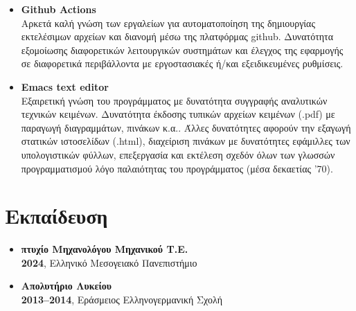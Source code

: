 \documentclass[a4paper,9pt]{extarticle}
\begin{document}
\begin{itemize}
\item{\textbf{Github Actions}} \\
        \noindent
        Αρκετά καλή γνώση των εργαλείων για αυτοματοποίηση της δημιουργίας εκτελέσιμων
        αρχείων και διανομή μέσω της πλατφόρμας github.
        Δυνατότητα εξομοίωσης διαφορετικών λειτουργικών συστημάτων και έλεγχος
        της εφαρμογής σε διαφορετικά περιβάλλοντα με εργοστασιακές ή/και
        εξειδικευμένες ρυθμίσεις. \\

\item{\textbf{Emacs text editor}} \\
        \noindent
        Εξαιρετική γνώση του προγράμματος με δυνατότητα συγγραφής αναλυτικών
        τεχνικών κειμένων. Δυνατότητα έκδοσης τυπικών αρχείων κειμένων (.pdf)
        με παραγωγή διαγραμμάτων, πινάκων κ.α.. Άλλες δυνατότητες αφορούν την
        εξαγωγή στατικών ιστοσελίδων (.html),
        διαχείριση πινάκων με δυνατότητες εφάμιλλες των υπολογιστικών φύλλων,
        επεξεργασία και εκτέλεση σχεδόν όλων των γλωσσών προγραμματισμού λόγο
        παλαιότητας του προγράμματος (μέσα δεκαετίας '70).\\
\end{itemize}



\section*{Εκπαίδευση}

\noindent
\begin{itemize}
  \item{\textbf{πτυχίο Μηχανολόγου Μηχανικού Τ.Ε.}} \\
        \textbf{2024}, Ελληνικό Μεσογειακό Πανεπιστήμιο \\
\noindent
  \item{\textbf{Απολυτήριο Λυκείου}} \\
        \textbf{2013--2014}, Εράσμειος Ελληνογερμανική Σχολή \\
\end{itemize}
\end{document}

